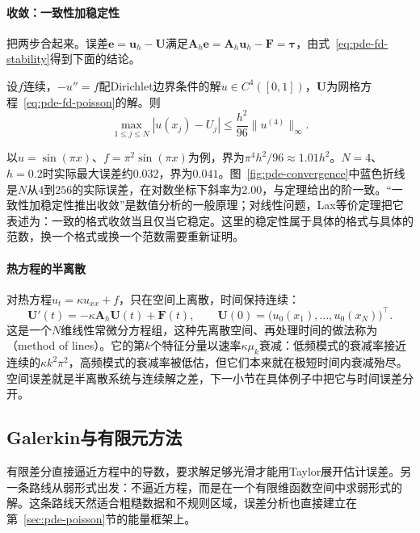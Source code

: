 \paragraph{收敛：一致性加稳定性}
把两步合起来。误差$\bm e=\bm u_h-\bm U$满足$\bm A_h\bm e=\bm A_h\bm u_h-\bm F=\bm\tau$，由式~\eqref{eq:pde-fd-stability}得到下面的结论。

\begin{theorem}[一维Poisson差分格式的收敛]
\label{thm:pde-fd-convergence}
设$f$连续，$-u''=f$配Dirichlet边界条件的解$u\in C^4([0,1])$，$\bm U$为网格方程~\eqref{eq:pde-fd-poisson}的解。则
\[
  \max_{1\leq j\leq N}|u(x_j)-U_j|\leq\frac{h^2}{96}\|u^{(4)}\|_\infty .
\]
\end{theorem}

以$u=\sin(\pi x)$、$f=\pi^2\sin(\pi x)$为例，界为$\pi^4h^2/96\approx1.01h^2$。$N=4$、$h=0.2$时实际最大误差约$0.032$，界为$0.041$。图~\ref{fig:pde-convergence}中蓝色折线是$N$从$4$到$256$的实际误差，在对数坐标下斜率为$2.00$，与定理给出的阶一致。“一致性加稳定性推出收敛”是数值分析的一般原理；对线性问题，Lax等价定理把它表述为：一致的格式收敛当且仅当它稳定。这里的稳定性属于具体的格式与具体的范数，换一个格式或换一个范数需要重新证明。

\paragraph{热方程的半离散}
对热方程$u_t=\kappa u_{xx}+f$，只在空间上离散，时间保持连续：
\begin{equation}
  \bm U'(t)=-\kappa\bm A_h\bm U(t)+\bm F(t),\qquad\bm U(0)=\bigl(u_0(x_1),\ldots,u_0(x_N)\bigr)^{\top}.
  \label{eq:pde-semidiscrete-heat}
\end{equation}
这是一个$N$维线性常微分方程组，这种先离散空间、再处理时间的做法称为（method of lines）。它的第$k$个特征分量以速率$\kappa\mu_k$衰减：低频模式的衰减率接近连续的$\kappa k^2\pi^2$，高频模式的衰减率被低估，但它们本来就在极短时间内衰减殆尽。空间误差就是半离散系统与连续解之差，下一小节在具体例子中把它与时间误差分开。

\subsection{Galerkin与有限元方法}
\label{sec:pde-fem}

有限差分直接逼近方程中的导数，要求解足够光滑才能用Taylor展开估计误差。另一条路线从弱形式出发：不逼近方程，而是在一个有限维函数空间中求弱形式的解。这条路线天然适合粗糙数据和不规则区域，误差分析也直接建立在第~\ref{sec:pde-poisson}节的能量框架上。

